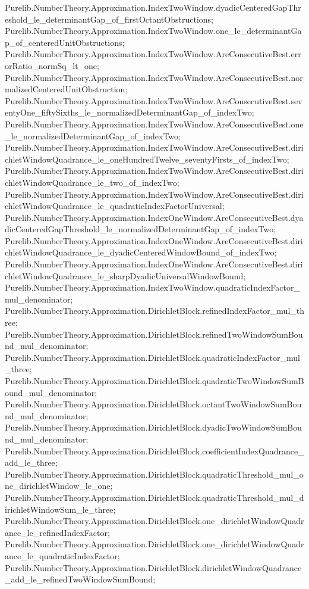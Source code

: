 \documentclass[11pt]{article}
\begin{document}
{Purelib.NumberTheory.Approximation.IndexTwoWindow.dyadicCenteredGapThreshold_le_determinantGap_of_firstOctantObstructions;
Purelib.NumberTheory.Approximation.IndexTwoWindow.one_le_determinantGap_of_centeredUnitObstructions;
Purelib.NumberTheory.Approximation.IndexTwoWindow.AreConsecutiveBest.errorRatio_normSq_lt_one;
Purelib.NumberTheory.Approximation.IndexTwoWindow.AreConsecutiveBest.normalizedCenteredUnitObstruction;
Purelib.NumberTheory.Approximation.IndexTwoWindow.AreConsecutiveBest.seventyOne_fiftySixths_le_normalizedDeterminantGap_of_indexTwo;
Purelib.NumberTheory.Approximation.IndexTwoWindow.AreConsecutiveBest.one_le_normalizedDeterminantGap_of_indexTwo;
Purelib.NumberTheory.Approximation.IndexTwoWindow.AreConsecutiveBest.dirichletWindowQuadrance_le_oneHundredTwelve_seventyFirsts_of_indexTwo;
Purelib.NumberTheory.Approximation.IndexTwoWindow.AreConsecutiveBest.dirichletWindowQuadrance_le_two_of_indexTwo;
Purelib.NumberTheory.Approximation.IndexTwoWindow.AreConsecutiveBest.dirichletWindowQuadrance_le_quadraticIndexFactorUniversal;
Purelib.NumberTheory.Approximation.IndexOneWindow.AreConsecutiveBest.dyadicCenteredGapThreshold_le_normalizedDeterminantGap_of_indexTwo;
Purelib.NumberTheory.Approximation.IndexOneWindow.AreConsecutiveBest.dirichletWindowQuadrance_le_dyadicCenteredWindowBound_of_indexTwo;
Purelib.NumberTheory.Approximation.IndexOneWindow.AreConsecutiveBest.dirichletWindowQuadrance_le_sharpDyadicUniversalWindowBound;
Purelib.NumberTheory.Approximation.IndexTwoWindow.quadraticIndexFactor_mul_denominator;
Purelib.NumberTheory.Approximation.DirichletBlock.refinedIndexFactor_mul_three;
Purelib.NumberTheory.Approximation.DirichletBlock.refinedTwoWindowSumBound_mul_denominator;
Purelib.NumberTheory.Approximation.DirichletBlock.quadraticIndexFactor_mul_three;
Purelib.NumberTheory.Approximation.DirichletBlock.quadraticTwoWindowSumBound_mul_denominator;
Purelib.NumberTheory.Approximation.DirichletBlock.octantTwoWindowSumBound_mul_denominator;
Purelib.NumberTheory.Approximation.DirichletBlock.dyadicTwoWindowSumBound_mul_denominator;
Purelib.NumberTheory.Approximation.DirichletBlock.coefficientIndexQuadrance_add_le_three;
Purelib.NumberTheory.Approximation.DirichletBlock.quadraticThreshold_mul_one_dirichletWindow_le_one;
Purelib.NumberTheory.Approximation.DirichletBlock.quadraticThreshold_mul_dirichletWindowSum_le_three;
Purelib.NumberTheory.Approximation.DirichletBlock.one_dirichletWindowQuadrance_le_refinedIndexFactor;
Purelib.NumberTheory.Approximation.DirichletBlock.one_dirichletWindowQuadrance_le_quadraticIndexFactor;
Purelib.NumberTheory.Approximation.DirichletBlock.dirichletWindowQuadrance_add_le_refinedTwoWindowSumBound;
}
\end{document}
